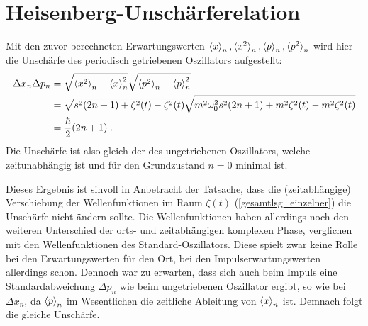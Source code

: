   \section{Heisenberg-Unschärferelation}
    Mit den zuvor berechneten Erwartungswerten $\braket{x}_n,\braket{x^2}_n,\braket{p}_n,\braket{p^2}_n$ wird hier die Unschärfe des periodisch getriebenen Oszillators aufgestellt:
    \begin{align}
      \Delta x_n\Delta p_n &= \sqrt{\braket{x^2}_n-\braket{x}^2_n}\sqrt{\braket{p^2}_n-\braket{p}^2_n} \notag\\
      &= \sqrt{s^2(2n+1)+\zeta^2(t)-\zeta^2(t)}\sqrt{m^2\omega^2_0s^2(2n+1)+m^2\zeta^2(t)-m^2\zeta^2(t)} \notag\\
      &= \frac{\hbar}{2}(2n+1) \; .
    \end{align}
    Die Unschärfe ist also gleich der des ungetriebenen Oszillators, welche zeitunabhängig ist und für den Grundzustand $n=0$ minimal ist.

    Dieses Ergebnis ist sinvoll in Anbetracht der Tatsache, dass die (zeitabhängige) Verschiebung der Wellenfunktionen im Raum $\zeta(t)$ (\ref{gesamtlsg_einzelner}) die Unschärfe nicht ändern sollte.
    Die Wellenfunktionen haben allerdings noch den weiteren Unterschied der orts- und zeitabhängigen komplexen Phase, verglichen mit den Wellenfunktionen des Standard-Oszillators.
    Diese spielt zwar keine  Rolle bei den Erwartungswerten für den Ort, bei den Impulserwartungswerten allerdings schon.
    Dennoch war zu erwarten, dass sich auch beim Impuls eine Standardabweichung $\Delta p_n$ wie beim ungetriebenen Oszillator ergibt, so wie bei $\Delta x_n$, da $\braket{p}_n$ im Wesentlichen die zeitliche Ableitung von $\braket{x}_n$ ist.
    Demnach folgt die gleiche Unschärfe.


\iffalse
  \subsection{Erwartungswerte der Energie}
    Hier werden wir den zeitabhängigen Erwartungswert der Energie $\braket{H(t)}_n$ aufstellen.
    Weiterhin wird der zeitlich, über eine Periode $T$, gemittelten Erwartungswert $\overline{H}_n$ mittels Formel (\ref{mittleres_H}) für eine beliebige Treibkraft bestimmt, indem wir die Quasienergien $\epsilon_n$ benutzen, welche wir in Kapitel \ref{espsilon_bel_kraft} für eine allgemeine periodische Treibkraft $S(t)$, in Abhängigkeit deren  Fourier-Koeffizienten, bestimmt haben.
\fi

